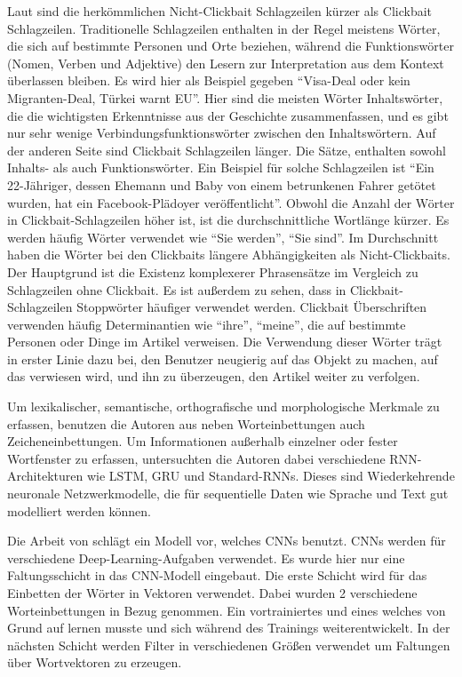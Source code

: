 Laut \cite*{Chakrabortya} sind die herkömmlichen Nicht-Clickbait Schlagzeilen kürzer als Clickbait Schlagzeilen. Traditionelle Schlagzeilen enthalten in der Regel meistens Wörter, die sich auf bestimmte Personen und Orte beziehen, während die Funktionswörter (Nomen, Verben und Adjektive) den Lesern zur Interpretation aus dem Kontext überlassen bleiben. Es wird hier als Beispiel gegeben \enquote{Visa-Deal oder kein Migranten-Deal, Türkei warnt EU}. Hier sind die meisten Wörter Inhaltswörter, die die wichtigsten Erkenntnisse aus der Geschichte zusammenfassen, und es gibt nur sehr wenige Verbindungsfunktionswörter zwischen den Inhaltswörtern. Auf der anderen Seite sind Clickbait Schlagzeilen länger. Die Sätze, enthalten sowohl Inhalts- als auch Funktionswörter. Ein Beispiel für solche Schlagzeilen ist \enquote{Ein 22-Jähriger, dessen Ehemann und Baby von einem betrunkenen Fahrer getötet wurden, hat ein Facebook-Plädoyer veröffentlicht}. Obwohl die Anzahl der Wörter in Clickbait-Schlagzeilen höher ist, ist die durchschnittliche Wortlänge kürzer. Es werden häufig Wörter verwendet wie \enquote{Sie werden}, \enquote{Sie sind}. Im Durchschnitt haben die Wörter bei den Clickbaits längere Abhängigkeiten als Nicht-Clickbaits. Der Hauptgrund ist die Existenz komplexerer Phrasensätze im Vergleich zu Schlagzeilen ohne Clickbait. Es ist außerdem zu sehen, dass in Clickbait-Schlagzeilen Stoppwörter häufiger verwendet werden. Clickbait Überschriften verwenden häufig Determinantien wie \enquote{ihre}, \enquote{meine}, die auf bestimmte Personen oder Dinge im Artikel verweisen. Die Verwendung dieser Wörter trägt in erster Linie dazu bei, den Benutzer neugierig auf das Objekt zu machen, auf das verwiesen wird, und ihn zu überzeugen, den Artikel weiter zu verfolgen.


Um lexikalischer, semantische, orthografische und morphologische Merkmale zu erfassen, benutzen die Autoren aus \cite*{Anand2019} neben Worteinbettungen auch Zeicheneinbettungen.  Um Informationen außerhalb einzelner oder fester Wortfenster zu erfassen, untersuchten die Autoren dabei verschiedene RNN-Architekturen wie LSTM, GRU und Standard-RNNs. Dieses sind Wiederkehrende neuronale Netzwerkmodelle, die für sequentielle Daten wie Sprache und Text gut modelliert werden können.


Die Arbeit von \cite*{Agrawal2017} schlägt ein Modell vor, welches CNNs benutzt. CNNs werden für verschiedene Deep-Learning-Aufgaben verwendet. Es wurde hier nur eine Faltungsschicht in das CNN-Modell eingebaut. Die erste Schicht wird für das Einbetten der Wörter in Vektoren verwendet. Dabei wurden 2 verschiedene Worteinbettungen in Bezug genommen. Ein vortrainiertes und eines welches von Grund auf lernen musste und sich während des Trainings weiterentwickelt. In der nächsten Schicht werden Filter in verschiedenen Größen verwendet um Faltungen über Wortvektoren zu erzeugen.

